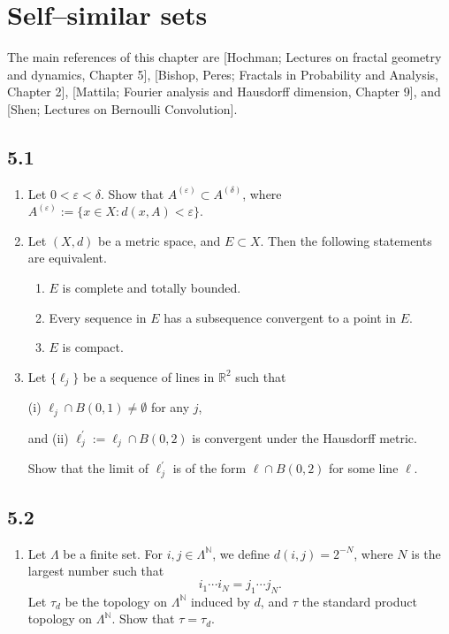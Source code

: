 \section{Self--similar sets}

The main references of this chapter are [Hochman; Lectures on fractal geometry and dynamics, Chapter 5], 
[Bishop, Peres; Fractals in Probability and Analysis, Chapter 2], 
[Mattila; Fourier analysis and Hausdorff dimension, Chapter 9], 
and [Shen; Lectures on Bernoulli Convolution].

\subsection*{5.1}
\begin{enumerate}
    \item Let $0<\varepsilon<\delta$. Show that $A^{(\varepsilon)} \subset A^{(\delta)}$, 
    where $A^{(\varepsilon)}:=\{x \in X: d(x, A)<\varepsilon\}$.
    \item Let $(X, d)$ be a metric space, and $E \subset X$. 
    Then the following statements are equivalent.
    \begin{enumerate}[label=(\roman*)]
    \item $E$ is complete and totally bounded.
    \item Every sequence in $E$ has a subsequence convergent to a point in $E$.
    \item $E$ is compact.
    \end{enumerate}
    \item Let $\{\ell_{j}\}$ be a sequence of lines in $\mathbb{R}^{2}$ such that

    (i) $\ell_{j} \cap B(0,1) \neq \emptyset$ for any $j$, 
    
    and (ii) $\ell_{j}^{\prime}:=\ell_{j} \cap B(0,2)$ is convergent under the Hausdorff metric.
    
    Show that the limit of $\ell_{j}^{\prime}$ is of the form $\ell \cap B(0,2)$ for some line $\ell$.
\end{enumerate}

\subsection*{5.2}
\begin{enumerate}
    \item Let $\Lambda$ be a finite set. 
    For $i, j \in \Lambda^{\mathbb{N}}$, we define $d(i, j)=2^{-N}$, 
    where $N$ is the largest number such that
    $$i_{1} \cdots i_{N}=j_{1} \cdots j_{N}.$$
    Let $\tau_{d}$ be the topology on $\Lambda^{\mathbb{N}}$ induced by $d$, 
    and $\tau$ the standard product topology on $\Lambda^{\mathbb{N}}$. 
    Show that $\tau=\tau_{d}$.
\end{enumerate}

